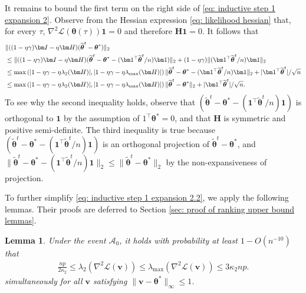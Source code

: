 \documentclass[letterpaper,12pt]{article}
\numberwithin{equation}{section}
\theoremstyle{plain}
\numberwithin{Theorem}{section}
\numberwithin{corollary}{section}
\numberwithin{proposition}{section}
\newtheorem{Lemma}{Lemma}
\numberwithin{Lemma}{section}
{
	\theoremstyle{definition}
	\newtheorem{Definition}{Definition}
	\newtheorem{example}{Example}
	\numberwithin{example}{section}
	\newtheorem{fact}{Fact}
	\numberwithin{fact}{section}
	\newtheorem{remark}{Remark}
}
\newcommand{\1}{\mathbbm{1}}
\def\bth{{\boldsymbol{\theta}}}
\begin{document}
	It remains to bound the first term on the right side of \eqref{eq: inductive step 1 expansion 2}. Observe from the Hessian expression \eqref{eq: likelihood hessian} that, for every $\tau$, $\nabla^2 \mathcal L(\bth(\tau)) \bm 1 = 0$ and therefore $\bm H \bm 1  = 0$. It follows that
	\begin{align}
		&\|((1-\eta\gamma)\bm I - \eta\bm H) (\widetilde\bth^t - \bth^*)\|_2 \notag \\
		&\leq \|((1-\eta\gamma)\bm I - \eta\bm H) (\widetilde\bth^t - \bth^* - (\bm 1^\top \widetilde\bth^t/n)\bm 1)\|_2 + (1-\eta\gamma)\|(\bm 1^\top \widetilde\bth^t/n)\bm 1\|_2  \notag \\
		&\leq \max\left(|1 - \eta\gamma - \eta\lambda_2(\bm H)|, |1 - \eta\gamma- \eta\lambda_{\max}(\bm H)| \right)\|\widetilde\bth^t - \bth^* - (\bm 1^\top \widetilde\bth^t/n)\bm 1\|_2 + |\bm 1^\top \widetilde\bth^t|/\sqrt{n}  \notag \\
		& \leq \max\left(|1 - \eta\gamma-\eta\lambda_2(\bm H)|, |1- \eta\gamma - \eta\lambda_{\max}(\bm H)| \right)\|\widetilde\bth^t - \bth^*\|_2 + |\bm 1^\top \widetilde\bth^t|/\sqrt{n}. \label{eq: inductive step 1 expansion 2.2}
	\end{align}
	To see why the second inequality holds, observe that $(\widetilde\bth^t - \bth^* - (\bm 1^\top \widetilde\bth^t/n)\bm 1)$ is orthogonal to $\bm 1$ by the assumption of $1^\top \bth^* = 0$, and that $\bm H$ is symmetric and positive semi-definite. The third inequality is true because $(\widetilde\bth^t - \bth^* - (\bm 1^\top \widetilde\bth^t/n)\bm 1)$ is an orthogonal projection of $\widetilde\bth^t - \bth^*$, and $\|\widetilde\bth^t - \bth^* - (\bm 1^\top \widetilde\bth^t/n)\bm 1\|_2 \leq \|\widetilde\bth^t - \bth^*\|_2$ by the non-expansiveness of projection.
	
	To further simplify \eqref{eq: inductive step 1 expansion 2.2}, we apply the following lemmas. Their proofs are deferred to Section \ref{sec: proof of ranking upper bound lemmas}.
	
	\begin{Lemma}
		\label{lm: spectrum of likelihood Hessian}
		Under the event $\mathcal A_0$, it holds with probability at least $1 - O(n^{-10})$ that 
		\begin{align*}
			\frac{np}{2\kappa_2} \leq \lambda_{2} (\nabla^2 \mathcal L(\bm v)) \leq \lambda_{\max} (\nabla^2 \mathcal L(\bm v)) \leq 3\kappa_2 np.
		\end{align*}
		simultaneously for all $\bm v$ satisfying $\|\bm v - \bth^*\|_\infty \leq 1$.
	\end{Lemma}
	
\end{document}
